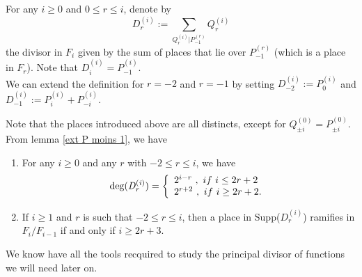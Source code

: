 \documentclass[10pt]{article}
\begin{document}
\s

\begin{def1} \label{divisors D's} For any $i \geq 0$ and $0 \leq r \leq i$, denote by
\[D_r^{(i)} := \sum\limits_{Q_r^{(i)}|P_{-1}^{(r)}} Q_r^{(i)}\]
the divisor in $F_i$ given by the sum of places that lie over $P_{-1}^{(r)}$ (which is a place in $F_r$). Note that $D_i^{(i)} = P_{-1}^{(i)}$. \\
We can extend the definition for $r=-2$ and $r=-1$ by setting $D_{-2}^{(i)} := P_0^{(i)}$ and $D_{-1}^{(i)} := P_i^{(i)} + P_{-i}^{(i)}$.
\end{def1}

\s

Note that the places introduced above are all distincts, except for $Q_{\pm i}^{(0)} = P_{\pm i}^{(0)}$. 
From lemma \ref{ext P moins 1}, we have

\s

\begin{corollary} \label{deg et ram D_r}
\begin{enumerate}
\item For any $i \geq 0$ and any $r$ with $-2 \leq r \leq i$, we have 
\begin{equation*}
\rm deg \it (D_r^{(i)}) = \left\{ \begin{array}{ll}
2^{i-r} \ , \ if \ i \leq 2r+2 \\
2^{r+2} \ , \ if \ i \geq 2r+2.
\end{array}
\right.
\end{equation*}
\item If $i \geq 1$ and $r$ is such that $-2 \leq r \leq i$, then a place in \rm Supp($D_r^{(i)}$) ramifies in $F_i/F_{i-1}$ if and only if $i \geq 2r+3$.
\end{enumerate}
\end{corollary}

\s

We know have all the tools recquired to study the principal divisor of functions we will need later on. 

\s
\end{document}
